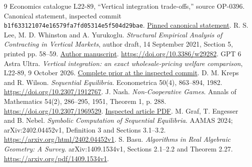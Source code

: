 \documentclass[11pt,a4paper]{article}
\numberwithin{equation}{section}
\theoremstyle{definition}
\begin{document}
\begin{thebibliography}{9}
 Economics catalogue L22-89, ``Vertical integration
trade-offs,'' source OP-0396. Canonical statement, inspected commit
\texttt{b1f633121074e16579fa7fd05314e5f504d29bae}.
\href{https://github.com/mehmetmars7/Erdosproblems-llm-hunter/blob/b1f633121074e16579fa7fd05314e5f504d29bae/attacks/open_problems/economics/statements/L22-89.tex}{Pinned canonical statement}.
 R. S. Lee, M. D. Whinston and A. Yurukoglu.
\emph{Structural Empirical Analysis of Contracting in Vertical Markets},
author draft, 14 September 2021, Section 5, printed pp. 58--59.
\href{https://robinlee.sites.fas.harvard.edu/papers/HandbookIO_Vol4_VerticalMarkets.pdf}{Author manuscript}.
\url{https://doi.org/10.3386/w29282}.
 GPT 6 Astra Ultra. \emph{Vertical integration: an exact
wholesale-pricing welfare comparison}, L22-89, 9 October 2026.
\href{https://github.com/mehmetmars7/Erdosproblems-llm-hunter/blob/b1f633121074e16579fa7fd05314e5f504d29bae/attacks/open_problems/economics/gpt_6_astra_ultra/L22-89.tex}{Complete prior at the inspected commit}.
 D. M. Kreps and R. Wilson. \emph{Sequential Equilibria}.
Econometrica 50(4), 863--894, 1982.
\url{https://doi.org/10.2307/1912767}.
 J. Nash. \emph{Non-Cooperative Games}.
Annals of Mathematics 54(2), 286--295, 1951, Theorem 1, p. 288.
\url{https://doi.org/10.2307/1969529}.
\href{https://irving.vassar.edu/faculty/gj/FTU/io/literature/Nash51.pdf}{Inspected article PDF}.
 M. Graf, T. Engesser and B. Nebel.
\emph{Symbolic Computation of Sequential Equilibria}. AAMAS 2024;
arXiv:2402.04452v1, Definition 3 and Sections 3.1--3.2.
\url{https://arxiv.org/html/2402.04452v1}.
 S. Basu. \emph{Algorithms in Real Algebraic Geometry:
A Survey}. arXiv:1409.1534v1, Sections 2.1--2.2 and Theorem 2.27.
\url{https://arxiv.org/pdf/1409.1534v1}.
\end{thebibliography}
\end{document}
